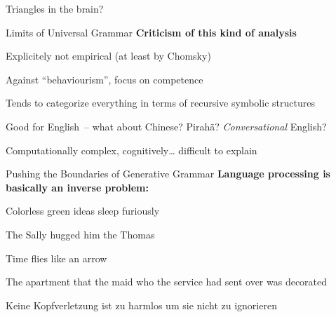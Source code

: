 \documentclass[aspectratio=169,cramped]{beamer}
\let\tempone\itemize
\let\temptwo\enditemize
\renewenvironment{itemize}{\tempone\addtolength{\itemsep}{-0\baselineskip}\addtolength{\parskip}{-0.2\baselineskip}}{\temptwo}
\newcommand{\ex}[1]{{\color{teal} #1}}
\begin{document}
\begin{frame}{Triangles in the brain?}
  \begin{figure}
    \centering
    \vspace{-2cm}
    \hspace{1cm}
  \end{figure}
\end{frame}

\begin{frame}{Limits of Universal Grammar}
	\textbf{Criticism of this kind of analysis}
  \begin{itemize}
  \item Explicitely not empirical (at least by Chomsky)
    \begin{itemize}
    \item Against ``behaviourism'', focus on competence
    \item Tends to categorize everything in terms of recursive symbolic structures
    \item Good for English~-- what about Chinese? Pirah\~{a}? \textit{Conversational} English?
    \end{itemize}
  \item Computationally complex, cognitively\ldots{} difficult to explain
  \end{itemize}
\end{frame}

\begin{frame}{Pushing the Boundaries of Generative Grammar}
	\textbf{Language processing is basically an inverse problem:}
  \begin{itemize}
  \item \ex{Colorless green ideas sleep furiously}
  \item \ex{The Sally hugged him the Thomas}
  \item \ex{Time flies like an arrow}
  \item \ex{The apartment that the maid who the service had sent over was decorated}
  \item \ex{Keine Kopfverletzung ist zu harmlos um sie nicht zu ignorieren}
  \end{itemize}
\end{frame}
\end{document}
